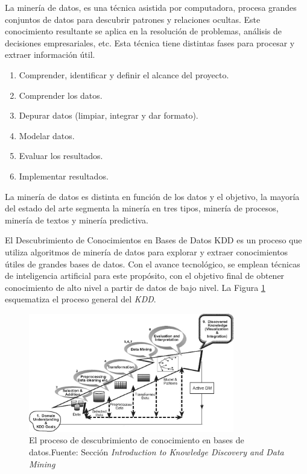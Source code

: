 La minería de datos, es una técnica asistida por computadora, procesa grandes conjuntos de datos para descubrir patrones y relaciones ocultas. Este conocimiento resultante se aplica en la resolución de problemas, análisis de decisiones empresariales, etc. Esta técnica tiene distintas fases para procesar y extraer información útil.

\begin{enumerate}
    \item Comprender, identificar y definir el alcance del proyecto.
    \item Comprender los datos.
    \item Depurar datos (limpiar, integrar y dar formato).
    \item Modelar datos.
    \item Evaluar los resultados.
    \item Implementar resultados.
\end{enumerate}

La minería de datos es distinta en función de los datos y el objetivo, la mayoría del estado del arte segmenta la minería en tres tipos, minería de procesos, minería de textos y minería predictiva.

El Descubrimiento de Conocimientos en Bases de Datos \gls{KDD} es un proceso que utiliza algoritmos de minería de datos para explorar y extraer conocimientos útiles de grandes bases de datos. Con el avance tecnológico, se emplean técnicas de inteligencia artificial para este propósito, con el objetivo final de obtener conocimiento de alto nivel a partir de datos de bajo nivel. La Figura \ref{fig:kdd} esquematiza el proceso general del \textit{KDD}.

\begin{figure}[H]
    \centering
    \includegraphics[angle=90,width=0.8\textwidth]{figures/chapter02/KDD.jpg}
    \caption{El proceso de descubrimiento de conocimiento en bases de datos.\newline{}Fuente: Sección \textit{Introduction to Knowledge Discovery and Data Mining} \cite{rokach2010data}}
    \label{fig:kdd}
\end{figure}

